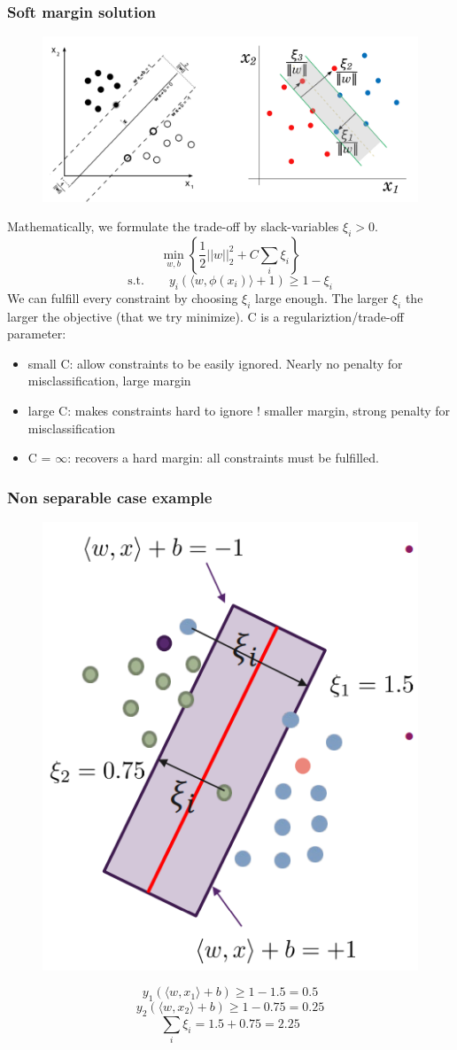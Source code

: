 \subsubsection{Soft margin solution}
\begin{figure}[!h]
    \includegraphics[width = \columnwidth]{figures/08/SoftMargin.png}
\end{figure}
Mathematically, we formulate the trade-off by slack-variables \(\xi_i > 0\).
\[
\min_{w,b}\left\{\frac{1}{2}||w||_2^2 + C\sum_{i}\xi_i\right\}
\]
\[
\text{s.t.} \qquad y_i(\langle w,\phi(x_i) \rangle + 1) \ge 1 - \xi_i
\]
We can fulfill every constraint by choosing \(\xi_i\) large enough.
The larger \(\xi_i\) the larger the objective (that we try minimize).
C is a regulariztion/trade-off parameter:
\begin{itemize}
    \item small C: allow constraints to be easily ignored. Nearly no penalty for misclassification, large margin
    \item large C: makes constraints hard to ignore ! smaller margin, strong penalty for misclassification
    \item C = \(\infty\): recovers a hard margin: all constraints must be fulfilled.
\end{itemize}
\subsubsection*{Non separable case example}
\begin{figure}[!h]
    \includegraphics[width = 0.3\columnwidth]{figures/08/SoftMarginExample.png}
\end{figure}
\[
y_1(\langle w,x_1 \rangle + b) \ge 1 - 1.5 = 0.5
\]
\[
y_2(\langle w,x_2 \rangle + b) \ge 1 - 0.75 = 0.25
\]
\[
\sum_{i} \xi_i = 1.5 + 0.75 = 2.25
\]
